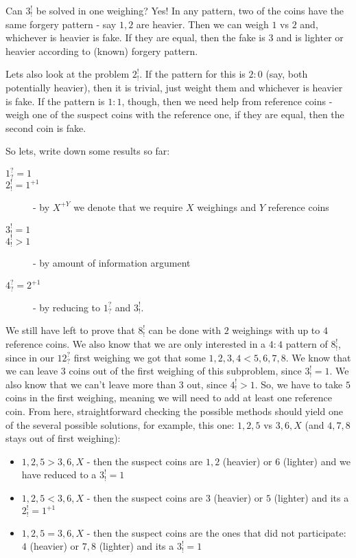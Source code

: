 \begin{problem}
Can $3^!_!$ be solved in one weighing? Yes! In any pattern, two of the coins have the same forgery pattern - say $1,2$ are heavier. Then we can weigh $1$ vs $2$ and, whichever is heavier is fake. If they are equal, then the fake is $3$ and is lighter or heavier according to (known) forgery pattern.

Lets also look at the problem $2^!_!$. If the pattern for this is $2:0$ (say, both potentially heavier), then it is trivial, just weight them and whichever is heavier is fake. If the pattern is $1:1$, though, then we need help from reference coins - weigh one of the suspect coins with the reference one, if they are equal, then the second coin is fake. 

So lets, write down some results so far:
\begin{description}
\item[$1^?_?=1$]
\item[$2^!_!=1^{+1}$] - by $X^{+Y}$ we denote that we require $X$ weighings and $Y$ reference coins
\item[$3^!_!=1$]
\item[$4^!_!>1$] - by amount of information argument
\item[$4^?_?=2^{+1}$] - by reducing to $1^?_?$ and $3^!_!$. \end{description}

We still have left to prove that $8_!^!$ can be done with $2$ weighings with up to $4$ reference coins. We also know that we are only interested in a $4:4$ pattern of $8_!^!$, since in our $12^?_?$ first weighing we got that some $1,2,3,4<5,6,7,8$. We know that we can leave $3$ coins out of the first weighing of this subproblem, since $3^!_!=1$. We also know that we can't leave more than $3$ out, since $4^!_!>1$. So, we have to take $5$ coins in the first weighing, meaning we will need to add at least one reference coin. From here, straightforward checking the possible methods should yield one of the several possible solutions, for example, this one: $1,2,5$ vs $3,6,X$ (and $4,7,8$ stays out of first weighing):
\begin{itemize}
\item $1,2,5 > 3,6,X$ - then the suspect coins are $1,2$ (heavier) or $6$ (lighter) and we have reduced to a $3^!_!=1$
\item $1,2,5 < 3,6,X$ - then the suspect coins are $3$ (heavier) or $5$ (lighter) and its a $2^!_!=1^{+1}$
\item $1,2,5 = 3,6,X$ - then the suspect coins are the ones that did not participate: $4$ (heavier) or $7,8$ (lighter) and its a $3^!_!=1$
\end{itemize}


\end{problem}
